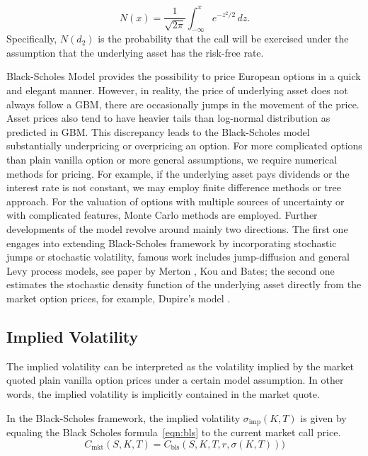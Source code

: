 \begin{equation}
 N(x)={\frac {1}{\sqrt {2\pi }}}\int _{-\infty }^{x}e^{-z^{2}/2}\,dz.
\end{equation}
Specifically, $N(d_2)$ is the probability that the call will be exercised under the assumption that the underlying asset has the risk-free rate.

 Black-Scholes Model provides the possibility to price European options in a quick and elegant manner. 
 However, in reality, the price of underlying asset does not always follow a GBM, there are occasionally jumps in the movement of the price. Asset prices also tend to have heavier tails than log-normal distribution as predicted in GBM. This discrepancy leads to the Black-Scholes model substantially underpricing or overpricing an option. For more complicated options than plain vanilla option or more general assumptions, we require numerical methods for pricing. For example, if the underlying asset pays dividends or the interest rate is not constant, we may employ finite difference methods or tree approach. For the valuation of options with multiple sources of uncertainty or with complicated features, Monte Carlo methods are employed. Further developments of the model revolve around mainly two directions. The first one engages into extending Black-Scholes framework by incorporating stochastic jumps or stochastic volatility, famous work includes jump-diffusion and general Levy process models, see paper by Merton \parencite{merton1976}, Kou \parencite{kou2002} and Bates\parencite{bates1996};   the second one estimates the stochastic density function of the underlying asset directly from the market option prices, for example, Dupire's model \parencite{Dupire}.
 \subsection{Implied Volatility }
 The implied volatility can be interpreted as the volatility implied by the market quoted plain vanilla option prices under a certain model assumption. In other words, the implied volatility is implicitly contained in the market quote\parencite{alexander1996}. 
 
 In the Black-Scholes framework, the implied volatility $\sigma_\text{imp}(K, T)$ is given by equaling the Black Scholes formula~\ref{eqn:bls} to the current market call price.  \begin{equation}
 C_\text{mkt}(S,K,T) = C_\text{bls}(S,K,T,r,\sigma(K, T)))
 \end{equation}
 
